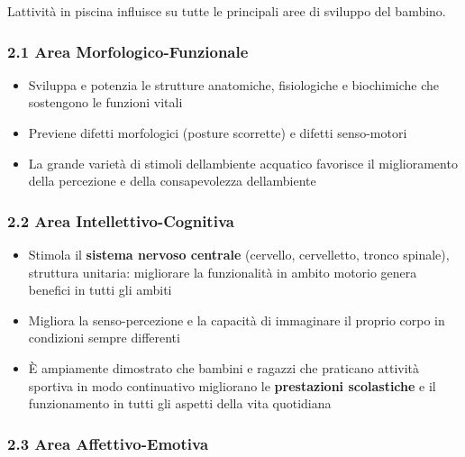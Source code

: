 \documentclass[a4paper,11pt]{article}
\providecommand{\tightlist}{%
  \setlength{\itemsep}{0pt}\setlength{\parskip}{0pt}}
\begin{document}
L\textquotesingle attività in piscina influisce su tutte le principali
aree di sviluppo del bambino.

\subsubsection{2.1 Area
      Morfologico-Funzionale}\label{area-morfologico-funzionale}

\begin{itemize}
      \tightlist
      \item
            Sviluppa e potenzia le strutture anatomiche, fisiologiche e
            biochimiche che sostengono le funzioni vitali
      \item
            Previene difetti morfologici (posture scorrette) e difetti
            senso-motori
      \item
            La grande varietà di stimoli dell\textquotesingle ambiente acquatico
            favorisce il miglioramento della percezione e della consapevolezza
            dell\textquotesingle ambiente
\end{itemize}

\subsubsection{2.2 Area
      Intellettivo-Cognitiva}\label{area-intellettivo-cognitiva}

\begin{itemize}
      \tightlist
      \item
            Stimola il \textbf{sistema nervoso centrale} (cervello, cervelletto,
            tronco spinale), struttura unitaria: migliorare la funzionalità in
            ambito motorio genera benefici in tutti gli ambiti
      \item
            Migliora la senso-percezione e la capacità di immaginare il proprio
            corpo in condizioni sempre differenti
      \item
            È ampiamente dimostrato che bambini e ragazzi che praticano attività
            sportiva in modo continuativo migliorano le \textbf{prestazioni
                  scolastiche} e il funzionamento in tutti gli aspetti della vita
            quotidiana
\end{itemize}

\subsubsection{2.3 Area Affettivo-Emotiva}\label{area-affettivo-emotiva}
\end{document}
